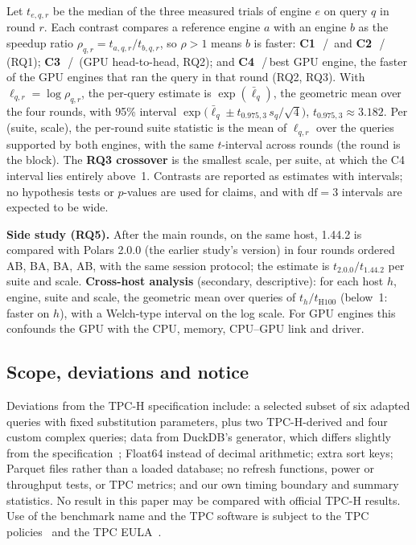 \documentclass[sigconf, nonacm]{acmart}
\begin{document}
Let $t_{e,q,r}$ be the median of the three measured trials of engine $e$ on
query $q$ in round $r$. Each contrast compares a reference engine $a$ with an
engine $b$ as the speedup ratio $\rho_{q,r} = t_{a,q,r} / t_{b,q,r}$, so
$\rho > 1$ means $b$ is faster: \textbf{C1}~\polarscpu{}\,/\,\polarsgpu{} and
\textbf{C2}~\sparkcpu{}\,/\,\sparkgpu{} (RQ1); \textbf{C3}~\sparkgpu{}\,/\,\polarsgpu{}
(GPU head-to-head, RQ2); and \textbf{C4}~\polarscpu{}\,/\,best GPU engine, the
faster of the GPU engines that ran the query in that round (RQ2, RQ3). With
$\ell_{q,r} = \log \rho_{q,r}$, the per-query estimate is $\exp(\bar\ell_q)$,
the geometric mean over the four rounds, with 95\% interval
$\exp\!\bigl(\bar\ell_q \pm t_{0.975,3}\, s_q / \sqrt{4}\bigr)$,
$t_{0.975,3} \approx 3.182$. Per (suite, scale), the per-round suite statistic
is the mean of $\ell_{q,r}$ over the queries supported by both engines, with the
same $t$-interval across rounds (the round is the block). The \textbf{RQ3
crossover} is the smallest scale, per suite, at which the C4 interval lies
entirely above~1. Contrasts are reported as estimates with intervals; no
hypothesis tests or $p$-values are used for claims, and with $\text{df}=3$
intervals are expected to be wide.

\textbf{Side study (RQ5).} After the main rounds, on the same host, \polarscpu{}
1.44.2 is compared with Polars 2.0.0 (the earlier study's version) in four
rounds ordered AB, BA, BA, AB, with the same session protocol; the estimate is
$t_{2.0.0} / t_{1.44.2}$ per suite and scale. \textbf{Cross-host analysis}
(secondary, descriptive): for each host $h$, engine, suite and scale, the
geometric mean over queries of $t_{h}/t_{\mathrm{H100}}$ (below~1: faster on
$h$), with a Welch-type interval on the log scale. For GPU engines this
confounds the GPU with the CPU, memory, CPU--GPU link and driver.

\subsection{Scope, deviations and notice}
\label{sec:scope}
\tpcdisclaimer{} Deviations from the TPC-H specification include: a selected
subset of six adapted queries with fixed substitution parameters, plus two
TPC-H-derived and four custom complex queries; data from DuckDB's generator,
which differs slightly from the specification~\citep{duckdb_tpch_ext};
Float64 instead of decimal arithmetic; extra sort keys; Parquet files rather
than a loaded database; no refresh functions, power or throughput tests, or
TPC metrics; and our own timing boundary and summary statistics. No result in
this paper may be compared with official TPC-H results. Use of the benchmark
name and the TPC software is subject to the TPC
policies~\citep{tpcpolicies620,tpcfairuse2019} and the TPC
EULA~\citep{tpceula22}.
\end{document}
